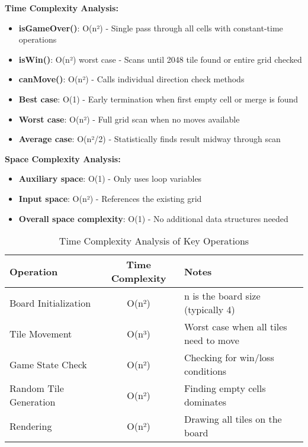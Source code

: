 \documentclass[12pt, a4paper]{article}
\begin{document}
\textbf{Time Complexity Analysis:}
\begin{itemize}
    \item \textbf{isGameOver()}: O(n²) - Single pass through all cells with constant-time operations
    \item \textbf{isWin()}: O(n²) worst case - Scans until 2048 tile found or entire grid checked
    \item \textbf{canMove()}: O(n²) - Calls individual direction check methods
    \item \textbf{Best case}: O(1) - Early termination when first empty cell or merge is found
    \item \textbf{Worst case}: O(n²) - Full grid scan when no moves available
    \item \textbf{Average case}: O(n²/2) - Statistically finds result midway through scan
\end{itemize}

\textbf{Space Complexity Analysis:}
\begin{itemize}
    \item \textbf{Auxiliary space}: O(1) - Only uses loop variables
    \item \textbf{Input space}: O(n²) - References the existing grid
    \item \textbf{Overall space complexity}: O(1) - No additional data structures needed
\end{itemize}

%


\begin{table}[h]
\centering
\caption{Time Complexity Analysis of Key Operations}
\begin{tabular}{|l|c|l|}
\hline
\textbf{Operation} & \textbf{Time Complexity} & \textbf{Notes} \\
\hline
Board Initialization & O(n²) & n is the board size (typically 4) \\
\hline
Tile Movement & O(n³) & Worst case when all tiles need to move \\
\hline
Game State Check & O(n²) & Checking for win/loss conditions \\
\hline
Random Tile Generation & O(n²) & Finding empty cells dominates \\
\hline
Rendering & O(n²) & Drawing all tiles on the board \\
\hline
\end{tabular}
\end{table}
\end{document}
